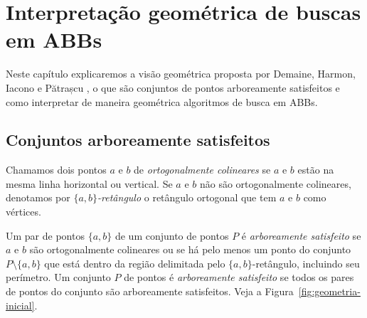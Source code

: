 
\chapter{Interpretação geométrica de buscas em ABBs}
\label{cap:geometria}

Neste capítulo explicaremos a visão geométrica proposta por Demaine, Harmon, Iacono e Pătrașcu \cite{geometry_of_bst}, o que são conjuntos de pontos arboreamente satisfeitos e como interpretar de maneira geométrica algoritmos de busca em ABBs.

\section{Conjuntos arboreamente satisfeitos}

Chamamos dois pontos $a$ e $b$ de \textit{ortogonalmente colineares} se $a$ e $b$ estão na mesma linha horizontal ou vertical. Se $a$ e $b$ não são ortogonalmente colineares, denotamos por \textit{$\{a,b\}$-retângulo} o retângulo ortogonal que tem $a$ e $b$ como vértices.

Um par de pontos $\{a,b\}$ de um conjunto de pontos $P$ é \textit{arboreamente satisfeito} se $a$ e $b$ são ortogonalmente colineares ou se há pelo menos um ponto do conjunto \( P \setminus \{a,b\} \) que está dentro da região delimitada pelo $\{a,b\}$-retângulo, incluindo seu perímetro. Um conjunto $P$ de pontos é \textit{arboreamente satisfeito} se todos os pares de pontos do conjunto são arboreamente satisfeitos. Veja a Figura~\ref{fig:geometria-inicial}.

